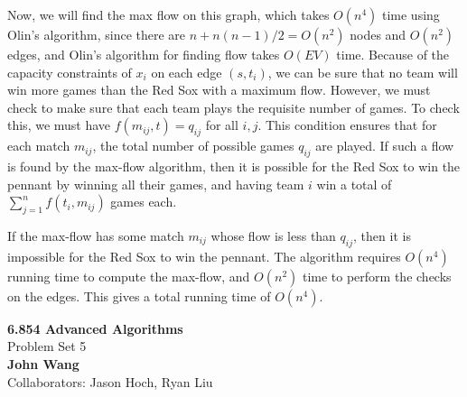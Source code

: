 \documentclass[psamsfonts]{amsart}
\newenvironment{sol}{\vspace{0.25cm}{\large \bfseries Solution:}}{\qedsymbol}
\newcommand{\makenewtitle}{
    \begin{center}
    {\huge \bfseries 6.854 Advanced Algorithms} \\
    Problem Set 5\\
    \vspace{0.25cm}
    {\bfseries John Wang} \\
    Collaborators: Jason Hoch, Ryan Liu
    \end{center}
    \vspace{0.5cm}
}
\begin{document}
\begin{sol}
Now, we will find the max flow on this graph, which takes $O(n^4)$ time using Olin's algorithm, since there are $n + n(n-1)/2 = O(n^2)$ nodes and $O(n^2)$ edges, and Olin's algorithm for finding flow takes $O(EV)$ time. Because of the capacity constraints of $x_i$ on each edge $(s,t_i)$, we can be sure that no team will win more games than the Red Sox with a maximum flow. However, we must check to make sure that each team plays the requisite number of games. To check this, we must have $f(m_{ij}, t) = q_{ij}$ for all $i,j$. This condition ensures that for each match $m_{ij}$, the total number of possible games $q_{ij}$ are played. If such a flow is found by the max-flow algorithm, then it is possible for the Red Sox to win the pennant by winning all their games, and having team $i$ win a total of $\sum_{j=1}^n f(t_i, m_{ij})$ games each. 

If the max-flow has some match $m_{ij}$ whose flow is less than $q_{ij}$, then it is impossible for the Red Sox to win the pennant. The algorithm requires $O(n^4)$ running time to compute the max-flow, and $O(n^2)$ time to perform the checks on the edges. This gives a total running time of $O(n^4)$.
\end{sol}

\newpage
\makenewtitle
\end{document}
